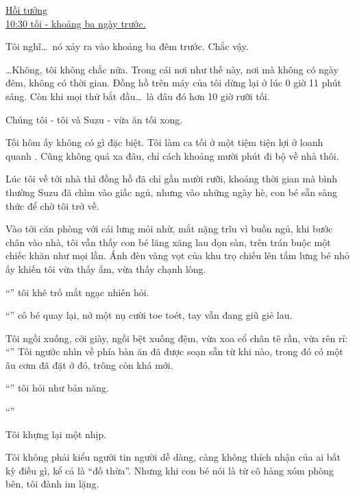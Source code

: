 \documentclass[../main.tex]{subfiles}
\begin{document}

\begin{center}
    \uline{Hồi tưởng\\10:30 tối - khoảng ba ngày trước.}
\end{center}

Tôi nghĩ\dots\ nó xảy ra vào khoảng ba đêm trước. Chắc vậy.

\dots Không, tôi không chắc nữa. Trong cái nơi như thế này, nơi mà không có ngày đêm, không có thời gian. Đồng hồ trên máy của tôi dừng lại ở lúc 0 giờ 11 phút sáng. Còn khi mọi thứ bắt đầu\dots\ là đâu đó hơn 10 giờ rưỡi tối.

Chúng tôi - tôi và Suzu - vừa ăn tối xong.

\il

Tối hôm ấy không có gì đặc biệt. Tôi làm ca tối ở một tiệm tiện lợi ở loanh quanh . Cũng không quá xa đâu, chỉ cách khoảng mười phút đi bộ về nhà thôi.

Lúc tôi về tới nhà thì đồng hồ đã chỉ gần mười rưỡi, khoảng thời gian mà bình thường Suzu đã chìm vào giấc ngủ, nhưng vào những ngày hè, con bé sẵn sàng thức để chờ tôi trở về.

Vào tới căn phòng với cái lưng mỏi nhừ, mắt nặng trĩu vì buồn ngủ, khi bước chân vào nhà, tôi vẫn thấy con bé lăng xăng lau dọn sàn, trên trán buộc một chiếc khăn như mọi lần. Ánh đèn vàng vọt của khu trọ chiếu lên tấm lưng bé nhỏ ấy khiến tôi vừa thấy ấm, vừa thấy chạnh lòng.

``'' tôi khẽ trố mắt ngạc nhiên hỏi.

``'' cô bé quay lại, nở một nụ cười toe toét, tay vẫn đang giũ giẻ lau.

Tôi ngồi xuống, cởi giày, ngồi bệt xuống đệm, vừa xoa cổ chân tê rần, vừa rên rỉ: ``'' Tôi ngước nhìn về phía bàn ăn đã được soạn sẵn từ khi nào, trong đó có một âu cơm đã đặt ở đó, trông còn khá mới.

``'' tôi hỏi như bản năng.

``''

Tôi khựng lại một nhịp.

Tôi không phải kiểu người tin người dễ dàng, càng không thích nhận của ai bất kỳ điều gì, kể cả là ``đồ thừa''. Nhưng khi con bé nói là từ cô hàng xóm phòng bên, tôi đành im lặng.
\end{document}
